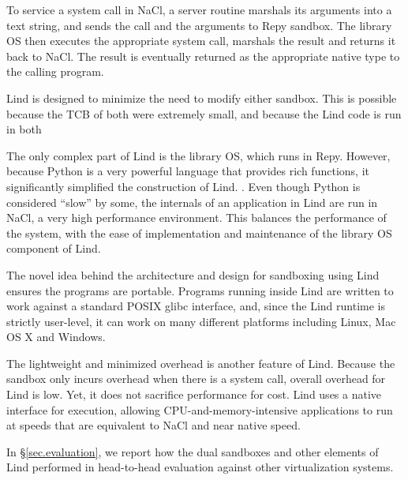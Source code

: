 To service a system call in NaCl, a server routine marshals its arguments into a text string,
and sends the call and the arguments to Repy sandbox.
The library OS then executes the appropriate system call, marshals the result and
returns it back to NaCl. The result is eventually returned as the appropriate native type to the calling program.

Lind is designed to minimize the need to modify either sandbox. This is possible
because the TCB of both were extremely small, and because the Lind code is run
in both

The only complex part of Lind is the library OS, which runs in Repy.
However, because Python is a very powerful language that provides rich functions,
it significantly simplified the construction of Lind. . Even though Python is considered ``slow'' by some,
the internals of an application in Lind are run in NaCl, a very high performance
environment. 
This balances the performance of the system, with the ease of implementation and maintenance
of the library OS component of Lind.

The novel idea behind the architecture and design for sandboxing using Lind
ensures the programs are portable.
Programs running inside Lind are written to work against  a standard POSIX glibc interface,
and, since the Lind runtime is strictly user-level, it can work on many different platforms
including Linux, Mac OS X and Windows.

The lightweight and minimized overhead is another feature of Lind. Because the sandbox only
 incurs overhead when there is a system call, overall overhead for Lind is low.
 Yet, it does not sacrifice performance for cost.
Lind uses a native interface for execution,
allowing CPU-and-memory-intensive applications to run at speeds that are equivalent
 to NaCl and near native speed.


In \S{\ref{sec.evaluation}}, we report how the dual sandboxes and other elements
of Lind performed in head-to-head evaluation against other virtualization systems.
